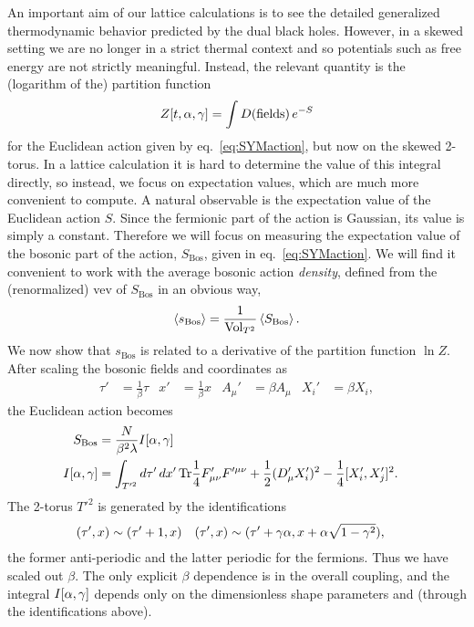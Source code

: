 An important aim of our lattice calculations is to see the detailed generalized thermodynamic behavior predicted by the dual black holes.
However, in a skewed setting we are no longer in a strict thermal context and so potentials such as free energy are not strictly meaningful.
Instead, the relevant quantity is the (logarithm of the) partition function
\begin{equation}
  \label{eq:partfunc}
  Z[t, \alpha, \gamma] = \int D(\text{fields}) \, e^{-S}
\end{equation}
for the Euclidean action given by eq.~\eqref{eq:SYMaction}, but now on the skewed 2-torus.
In a lattice calculation it is hard to determine the value of this integral directly, so instead, we focus on expectation values, which are much more convenient to compute.
A natural observable is the expectation value of the Euclidean action $S$.
Since the fermionic part of the action is Gaussian, its value is simply a constant.
Therefore we will focus on measuring the expectation value of the bosonic part of the action, $S_{\text{Bos}}$, given in eq.~\eqref{eq:SYMaction}.
We will find it convenient to work with the average bosonic action \emph{density}, defined from the (renormalized) vev of $S_{\text{Bos}}$ in an obvious way,
\begin{equation}
  \left\langle s_{\text{Bos}} \right\rangle = \frac{1}{\text{Vol}_{T^2}} \left\langle S_{\text{Bos}} \right\rangle.
\end{equation}
We now show that $s_{\text{Bos}}$ is related to a derivative of the partition function $\ln Z$.
After scaling the bosonic fields and coordinates as
\begin{align}
  \tau' & = \frac{1}{\beta} \tau &
  x' & = \frac{1}{\beta} x &
  A_{\mu}' & = \beta A_{\mu} &
  X_i' & = \beta X_i,
\end{align}
the Euclidean action becomes
\begin{align}
  S_{\text{Bos}} & = \frac{N}{\beta^2 \lambda} I[\alpha, \gamma] \cr
  I[\alpha, \gamma] & = \int_{T'^2} d\tau' \, dx' \, \mathrm{Tr}{\frac{1}{4} F_{\mu\nu}' F'^{\mu\nu} + \frac{1}{2} (D_{\mu}' X_i')^2 - \frac{1}{4} [X_i', X_j']^2}.
\end{align}
The 2-torus $T'^2$ is generated by the identifications
\begin{align}
  (\tau', x) & \sim (\tau' + 1, x) &
  (\tau', x) & \sim (\tau' + \gamma \alpha, x + \alpha\sqrt{1 - \gamma^2}),
\end{align}
the former anti-periodic and the latter periodic for the fermions.
Thus we have scaled out $\beta$.
The only explicit $\beta$ dependence is in the overall coupling, and the integral $I[\alpha, \gamma]$ depends only on the dimensionless shape parameters \al and \ga (through the identifications above).
